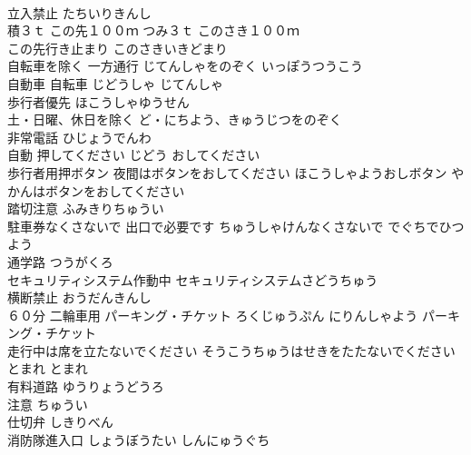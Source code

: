 \documentclass[8pt]{extreport}
\begin{document}
\begin{CJK}{UTF8}{min}
\\	立入禁止	たちいりきんし	
\\	積３ｔ この先１００ｍ	つみ３ｔ このさき１００ｍ	
\\	この先行き止まり	このさきいきどまり	
\\	自転車を除く 一方通行	じてんしゃをのぞく いっぽうつうこう	
\\	自動車 自転車	じどうしゃ じてんしゃ	
\\	歩行者優先	ほこうしゃゆうせん	
\\	土・日曜、休日を除く	ど・にちよう、きゅうじつをのぞく	
\\	非常電話	ひじょうでんわ	
\\	自動 押してください	じどう おしてください	
\\	歩行者用押ボタン 夜間はボタンをおしてください	ほこうしゃようおしボタン やかんはボタンをおしてください	
\\	踏切注意	ふみきりちゅうい	
\\	駐車券なくさないで 出口で必要です	ちゅうしゃけんなくさないで でぐちでひつよう	
\\	通学路	つうがくろ	
\\	セキュリティシステム作動中	セキュリティシステムさどうちゅう	
\\	横断禁止	おうだんきんし	
\\	６０分 二輪車用 パーキング・チケット	ろくじゅうぷん にりんしゃよう パーキング・チケット	
\\	走行中は席を立たないでください	そうこうちゅうはせきをたたないでください	
\\	とまれ	とまれ	
\\	有料道路	ゆうりょうどうろ	
\\	注意	ちゅうい	
\\	仕切弁	しきりべん	
\\	消防隊進入口	しょうぼうたい しんにゅうぐち	
\end{CJK}
\end{document}
